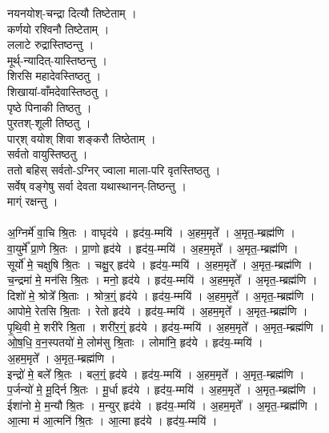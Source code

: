 नयनयोश्-चन्द्रा दित्यौ तिष्टेताम् ।\\
कर्णयो रश्विनौ तिष्टेताम् ।\\
ललाटे रुद्रास्तिष्ठन्तु ।\\
मूर्थ्-न्यादित्-यास्तिष्ठन्तु ।\\
शिरसि महादेवस्तिष्ठतु ।\\
शिखायां-वाँमदेवास्तिष्ठतु ।\\
पृष्ठे पिनाकी तिष्ठतु ।\\
पुरतश्-शूली तिष्ठतु ।\\
पार्​श् वयोश् शिवा शङ्करौ तिष्ठेताम् ।\\
सर्वतो वायुस्तिष्ठतु ।\\
ततो बहिस् सर्वतो-ऽग्निर् ज्वाला माला-परि वृतस्तिष्ठतु ।\\
सर्वेष् वङ्गेषु सर्वा देवता यथास्थानन्-तिष्ठन्तु ।\\
माग्ं रक्षन्तु ।\\
\\
अ॒ग्निर्मे॑ वा॒चि श्रि॒तः । वाघृद॑ये । हृद॑य॒-म्मयि॑ । अ॒हम॒मृते᳚ । अ॒मृत॒-म्ब्रह्म॑णि ।\\
वा॒युर्मे᳚ प्रा॒णे श्रि॒तः । प्रा॒णो हृद॑ये । हृद॑य॒-म्मयि॑ । अ॒हम॒मृते᳚ । अ॒मृत॒-म्ब्रह्म॑णि ।\\
सूर्यो॑ मे॒ चक्षुषि श्रि॒तः । चक्षु॒र्​ हृद॑ये । हृद॑य॒-म्मयि॑ । अ॒हम॒मृते᳚ । अ॒मृत॒-म्ब्रह्म॑णि ।\\
च॒न्द्रमा॑ मे॒ मन॑सि श्रि॒तः । मनो॒ हृद॑ये । हृद॑य॒-म्मयि॑ । अ॒हम॒मृते᳚ । अ॒मृत॒-म्ब्रह्म॑णि ।\\
दिशो॑ मे॒ श्रोत्रे᳚ श्रि॒ताः । श्रोत्र॒ग्ं॒ हृद॑ये । हृद॑य॒-म्मयि॑ । अ॒हम॒मृते᳚ । अ॒मृत॒-म्ब्रह्म॑णि ।\\
आपोमे॒ रेतसि श्रि॒ताः । रेतो हृद॑ये । हृद॑य॒-म्मयि॑ । अ॒हम॒मृते᳚ । अ॒मृत॒-म्ब्रह्म॑णि ।\\
पृ॒थि॒वी मे॒ शरी॑रे श्रि॒ता । शरी॑र॒ग्ं॒ हृद॑ये । हृद॑य॒-म्मयि॑ । अ॒हम॒मृते᳚ । अ॒मृत॒-म्ब्रह्म॑णि ।\\
ओ॒ष॒धि॒ व॒न॒स्पतयो॑ मे॒ लोम॑सु श्रि॒ताः । लोमा॑नि॒ हृद॑ये । हृद॑य॒-म्मयि॑ । \\
अ॒हम॒मृते᳚ । अ॒मृत॒-म्ब्रह्म॑णि ।\\
इन्द्रो॑ मे॒ बले᳚ श्रि॒तः । बल॒ग्ं॒ हृद॑ये । हृद॑य॒-म्मयि॑ । अ॒हम॒मृते᳚ । अ॒मृत॒-म्ब्रह्म॑णि ।\\
प॒र्जन्यो॑ मे॒ मू॒र्द्नि श्रि॒तः । मू॒र्धा हृद॑ये । हृद॑य॒-म्मयि॑ । अ॒हम॒मृते᳚ । अ॒मृत॒-म्ब्रह्म॑णि ।\\
ईशा॑नो मे॒ म॒न्यौ श्रि॒तः । म॒न्युर्​ हृद॑ये । हृद॑य॒-म्मयि॑ । अ॒हम॒मृते᳚ । अ॒मृत॒-म्ब्रह्म॑णि ।\\
आ॒त्मा म॑ आ॒त्मनि॑ श्रि॒तः । आ॒त्मा हृद॑ये । हृद॑य॒-म्मयि॑ । \\
